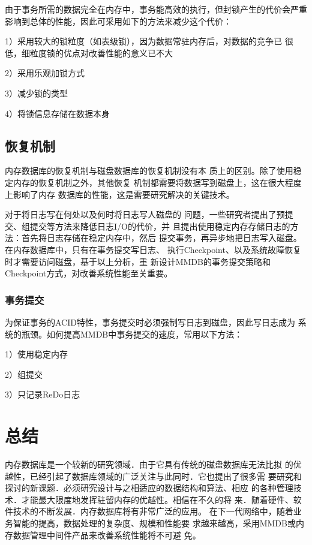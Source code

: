 \documentclass[literaturereview]{zjutreport}
\begin{document}
由于事务所需的数据完全在内存中，事务能高效的执行，但封锁产生的代价会严重影响到总体的性能，因此可采用如下的方法来减少这个代价：

1）采用较大的锁粒度（如表级锁），因为数据常驻内存后，对数据的竞争已
很低，细粒度锁的优点对改善性能的意义已不大

2）采用乐观加锁\cite{ref:15}方式

3）减少锁的类型

4）将锁信息存储在数据本身

\section{恢复机制}
内存数据库的恢复机制\cite{ref:16}与磁盘数据库的恢复机制没有本
质上的区别。除了使用稳定内存的恢复机制之外，其他恢复
机制都需要将数据写到磁盘上，这在很大程度上影响了内存
数据库的性能，这是需要研究解决的关键技术。

对于将日志写在何处以及何时将日志\cite{ref:17}写人磁盘的
问题，一些研究者提出了预提交、组提交等方法来降低日志I/O的代价，并
且提出使用稳定内存存储日志的方法：首先将日志存储在稳定内存中，然后
提交事务，再异步地把日志写入磁盘。在内存数据库中，只有在事务提交写日志、
执行Checkpoint\cite{ref:18}、以及系统故障恢复时才需要访问磁盘，基于以上分析，重
新设计MMDB的事务提交策略和Checkpoint方式，对改善系统性能至关重要。


\subsection{事务提交}
为保证事务的ACID特性，事务提交时必须强制写日志到磁盘，因此写日志成为
系统的瓶颈。如何提高MMDB中事务提交的速度，常用以下方法：

1）使用稳定内存

2）组提交

3）只记录ReDo日志

\chapter{总结}
内存数据库是一个较新的研究领域．由于它具有传统的磁盘数据库无法比拟
的优越性\cite{ref:19}，已经引起了数据库领域的广泛关注与此同时．它也提出了很多需
要研究和探讨的新课题．必须研究设计与之相适应的数据结构和算法、相应
的各种管理技术．才能最大限度地发挥驻留内存的优越性。相信在不久的将
来．随着硬件、软件技术的不断发展．内存数据库将有非常广泛的应用\cite{ref:20}。
在下一代网络中，随着业务智能的提高，数据处理的复杂度、规模和性能要
求越来越高，采用MMDB或内存数据管理中间件产品来改善系统性能将不可避
免。

\backmatter
\endgroup %
\clearpage %


\nocite{*}                                   %

\end{document}
